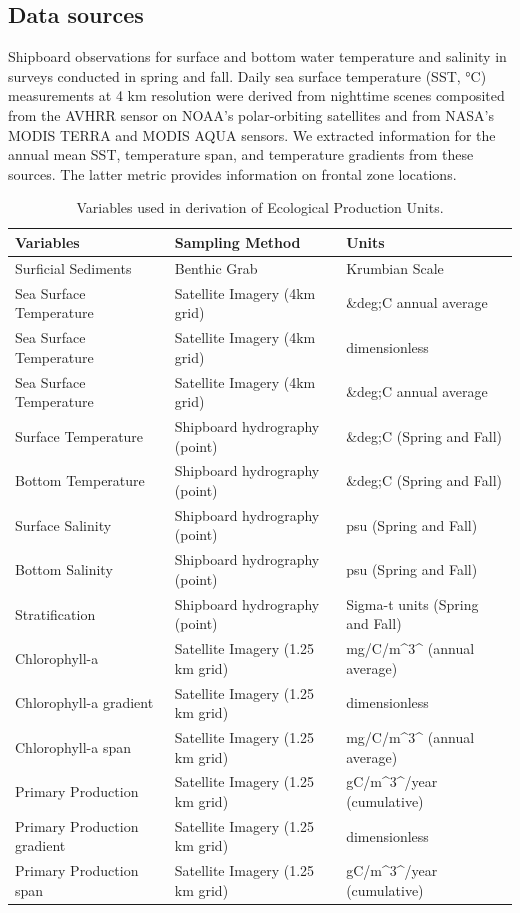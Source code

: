 \documentclass[
]{book}
\begin{document}
\hypertarget{data-sources-14}{%
\subsection{Data sources}\label{data-sources-14}}

Shipboard observations for surface and bottom water temperature and salinity in surveys conducted in spring and fall. Daily sea surface temperature (SST, °C) measurements at 4 km resolution were derived from nighttime scenes composited from the AVHRR sensor on NOAA's polar-orbiting satellites and from NASA's MODIS TERRA and MODIS AQUA sensors. We extracted information for the annual mean SST, temperature span, and temperature gradients from these sources. The latter metric provides information on frontal zone locations.

\begin{table}

\caption{\label{tab:epuinputs}Variables used in derivation of Ecological Production Units.}
\centering
\begin{tabular}[t]{lll}
\toprule
Variables & Sampling Method & Units\\
\midrule
Surficial Sediments & Benthic Grab & Krumbian Scale\\
Sea Surface Temperature & Satellite Imagery (4km grid) & \&deg;C annual average\\
Sea Surface Temperature & Satellite Imagery (4km grid) & dimensionless\\
Sea Surface Temperature & Satellite Imagery (4km grid) & \&deg;C annual average\\
Surface Temperature & Shipboard hydrography (point) & \&deg;C (Spring and Fall)\\
\addlinespace
Bottom Temperature & Shipboard hydrography (point) & \&deg;C (Spring and Fall)\\
Surface Salinity & Shipboard hydrography (point) & psu (Spring and Fall)\\
Bottom Salinity & Shipboard hydrography (point) & psu (Spring and Fall)\\
Stratification & Shipboard hydrography (point) & Sigma-t units (Spring and Fall)\\
Chlorophyll-a & Satellite Imagery (1.25 km grid) & mg/C/m\textasciicircum{}3\textasciicircum{} (annual average)\\
\addlinespace
Chlorophyll-a gradient & Satellite Imagery (1.25 km grid) & dimensionless\\
Chlorophyll-a span & Satellite Imagery (1.25 km grid) & mg/C/m\textasciicircum{}3\textasciicircum{} (annual average)\\
Primary Production & Satellite Imagery (1.25 km grid) & gC/m\textasciicircum{}3\textasciicircum{}/year (cumulative)\\
Primary Production gradient & Satellite Imagery (1.25 km grid) & dimensionless\\
Primary Production span & Satellite Imagery (1.25 km grid) & gC/m\textasciicircum{}3\textasciicircum{}/year (cumulative)\\
\bottomrule
\end{tabular}
\end{table}
\end{document}
